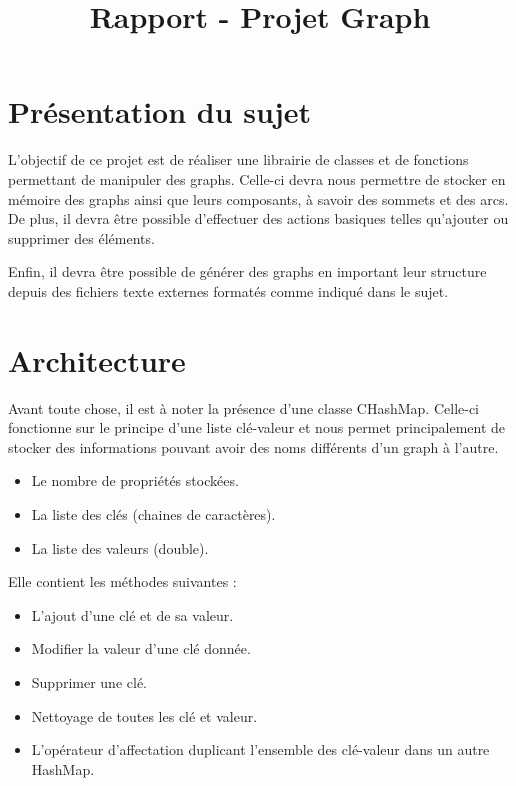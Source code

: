 
\title{Rapport - Projet Graph}
\fancyhf{}
\lhead{\leftmark}


	\maketitle
	\tableofcontents
	\chapter{Présentation du sujet}
		L'objectif de ce projet est de réaliser une librairie de classes et de fonctions permettant de manipuler des graphs. Celle-ci devra nous permettre de stocker en mémoire des graphs ainsi que leurs composants, à savoir des sommets et des arcs. De plus, il devra être possible d'effectuer des actions basiques telles qu'ajouter ou supprimer des éléments.
		
		Enfin, il devra être possible de générer des graphs en important leur structure depuis des fichiers texte externes formatés comme indiqué dans le sujet.
	
	\chapter{Architecture}
		Avant toute chose, il est à noter la présence d'une classe CHashMap. Celle-ci fonctionne sur le principe d'une liste clé-valeur et nous permet principalement de stocker des informations pouvant avoir des noms différents d'un graph à l'autre.
		
		\begin{itemize}
			\item Le nombre de propriétés stockées.
			\item La liste des clés (chaines de caractères).
			\item La liste des valeurs (double).
		\end{itemize}
		
		Elle contient les méthodes suivantes :
		\begin{itemize}
			\item L'ajout d'une clé et de sa valeur.
			\item Modifier la valeur d'une clé donnée.
			\item Supprimer une clé.
			\item Nettoyage de toutes les clé et valeur.
			\item L'opérateur d'affectation duplicant l'ensemble des clé-valeur dans un autre HashMap.
		\end{itemize}
	
